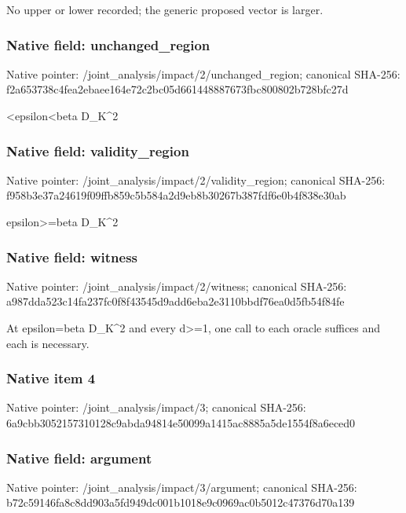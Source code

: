 \documentclass[10pt,a4paper]{article}
\begin{document}
\begingroup\raggedright\sloppy No upper or lower recorded;\allowbreak{} the generic proposed vector is larger.\par\endgroup

\subsubsection{Native field: unchanged\_\allowbreak{}region}
Native pointer: /joint\_\allowbreak{}analysis/impact/2/unchanged\_\allowbreak{}region; canonical SHA-256: f2a653738c4fea2ebaee164e72c2bc05d661448887673fbc800802b728bfc27d

\begingroup\raggedright{}<epsilon<beta D\_\allowbreak{}K\textasciicircum{}2\par\endgroup

\subsubsection{Native field: validity\_\allowbreak{}region}
Native pointer: /joint\_\allowbreak{}analysis/impact/2/validity\_\allowbreak{}region; canonical SHA-256: f958b3e37a24619f09ffb859c5b584a2d9eb8b30267b387fdf6e0b4f838e30ab

\begingroup\raggedright\sloppy epsilon>=\allowbreak{}beta D\_\allowbreak{}K\textasciicircum{}2\par\endgroup

\subsubsection{Native field: witness}
Native pointer: /joint\_\allowbreak{}analysis/impact/2/witness; canonical SHA-256: a987dda523c14fa237fc0f8f43545d9add6eba2e3110bbdf76ea0d5fb54f84fe

\begingroup\raggedright\sloppy At epsilon=\allowbreak{}beta D\_\allowbreak{}K\textasciicircum{}2 and every d>=\allowbreak{}1,\allowbreak{} one call to each oracle suffices and each is necessary.\par\endgroup

\subsubsection{Native item 4}
Native pointer: /joint\_\allowbreak{}analysis/impact/3; canonical SHA-256: 6a9cbb3052157310128c9abda94814e50099a1415ac8885a5de1554f8a6eced0

\subsubsection{Native field: argument}
Native pointer: /joint\_\allowbreak{}analysis/impact/3/argument; canonical SHA-256: b72c59146fa8c8dd903a5fd949dc001b1018e9c0969ac0b5012c47376d70a139
\end{document}
